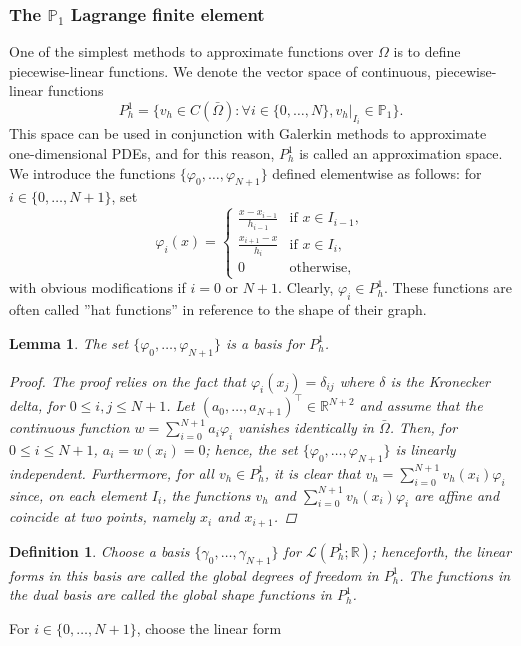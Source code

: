 \documentclass{article}
\newtheorem{definition}{Definition}
\newtheorem{lemma}{Lemma}
\begin{document}
\subsubsection{The $\mathbb{P}_1$ Lagrange finite element}
One of the simplest methods to approximate functions over $\Omega$ is to define piecewise-linear functions. We denote the vector space of continuous, piecewise-linear functions
$$ P_h^1 = \{ v_h \in C(\bar{\Omega}): \forall i \in \{0, \dots, N\}, v_h|_{I_i} \in \mathbb{P}_1 \}.$$
This space can be used in conjunction with Galerkin methods to approximate one-dimensional PDEs, and for this reason, $P_h^1$ is called an approximation space.
We introduce the functions $\{\varphi_0, \dots, \varphi_{N+1}\}$ defined elementwise as follows: for $i \in \{0, \dots, N+1\}$, set
$$ \varphi_i(x) = \begin{cases} \frac{x - x_{i-1}}{h_{i-1}} & \text{if } x \in I_{i-1}, \\ \frac{x_{i+1} - x}{h_i} & \text{if } x \in I_i, \\ 0 & \text{otherwise}, \end{cases} $$
with obvious modifications if $i = 0$ or $N+1$. Clearly, $\varphi_i \in P_h^1$. These functions are often called ''hat functions'' in reference to the shape of their graph.
\begin{lemma} \label{hatbasis}
    The set $\{\varphi_0, \dots, \varphi_{N+1}\}$ is a basis for $P_h^1$.
    \begin{proof}
        The proof relies on the fact that $\varphi_i(x_j) = \delta_{ij}$ where $\delta$ is the Kronecker delta, for $0 \le i,j \le N+1$. Let $(a_0, \dots, a_{N+1})^\top \in \mathbb{R}^{N+2}$ and assume that the continuous function $w = \sum_{i=0}^{N+1} a_i \varphi_i$ vanishes identically in $\bar{\Omega}$. Then, for $0 \le i \le N+1$, $a_i = w(x_i) = 0$; hence, the set $\{\varphi_0, \dots, \varphi_{N+1}\}$ is linearly independent. Furthermore, for all $v_h \in P_h^1$, it is clear that $v_h = \sum_{i=0}^{N+1} v_h(x_i) \varphi_i$ since, on each element $I_i$, the functions $v_h$ and $\sum_{i=0}^{N+1} v_h(x_i) \varphi_i$ are affine and coincide at two points, namely $x_i$ and $x_{i+1}$.
    \end{proof}
\end{lemma}
\begin{definition}
    Choose a basis $\{\gamma_0, \dots, \gamma_{N+1}\}$ for $\mathcal{L}(P_h^1;\mathbb{R})$; henceforth, the linear forms in this basis are called the global degrees of freedom in $P_h^1$. The functions in the dual basis are called the global shape functions in $P_h^1$. 
\end{definition}
For $i \in \{0, \dots, N+1\}$, choose the linear form
\end{document}
